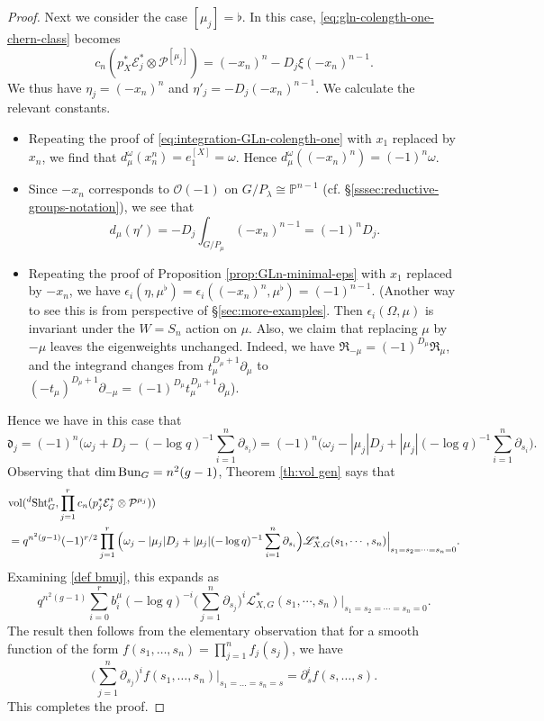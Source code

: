 \documentclass[reqno]{amsart}
\numberwithin{equation}{subsection}
\theoremstyle{definition}
\def\PP{\mathbb{P}}
\newcommand\cE{\mathcal{E}}
\newcommand\cO{\mathcal{O}}
\newcommand\cP{\mathcal{P}}
\newcommand\frR{\mathfrak{R}}
\newcommand\frd{\mathfrak{d}}
\newcommand{\sL}{{\mathscr{L}}}
\newcommand{\Bun}{\textup{Bun}}
\newcommand\Sht{\textup{Sht}}
\newcommand{\vol}{\textup{vol}}
\newcommand\ot{\otimes}
\newcommand\pl{\partial}
\begin{document}
\begin{proof}
 Next we consider the case $[\mu_j] = \flat$. In this case, \eqref{eq:gln-colength-one-chern-class} becomes
 \[
 c_n(p_X^* \cE_j^* \otimes \cP^{[\mu_j]}) = (-x_n)^n - D_j \xi (-x_n)^{n-1}. 
 \]
We thus have $\eta_j = (-x_n)^n$ and $\eta'_j = - D_j (-x_n)^{n-1}$. We calculate the relevant constants. 
\begin{itemize}

\item Repeating the proof of \eqref{eq:integration-GLn-colength-one} with $x_1$ replaced by $x_n$, we find that $d_{\mu}^\omega (x_n^n) = e_1^{[X]} =  \omega$. Hence $d_\mu^\omega((-x_n)^n) = (-1)^n \omega $. 

 
\item Since $-x_n$ corresponds to $\cO(-1)$ on $G/P_\lambda \cong \PP^{n-1}$ (cf. \S \ref{sssec:reductive-groups-notation}), we see that 
\[
d_{\mu}(\eta') =  -D_j \int_{G/P_\mu} (-x_n)^{n-1} = (-1)^n D_j  .
\]

\item Repeating the proof of Proposition \ref{prop:GLn-minimal-eps} with $x_1$ replaced by $-x_n$, we have $\epsilon_i(\eta, \mu^\flat) = \epsilon_i((-x_n)^n, \mu^\flat) = (-1)^{n-1}$. (Another way to see this is from perspective of \S \ref{sec:more-examples}. Then $\epsilon_i(\Omega, \mu)$ is invariant under the $W = S_n$ action on $\mu$. Also, we claim that replacing $\mu$ by $-\mu$ leaves the eigenweights unchanged. Indeed, we have $\frR_{-\mu} = (-1)^{D_\mu} \frR_\mu$, and the integrand changes from $t_\mu^{D_\mu + 1} \partial_\mu$ to $(-t_\mu)^{D_\mu+1} \partial_{-\mu} = (-1)^{D_\mu} t_\mu^{D_\mu+1}\partial_{\mu}$). 

\end{itemize}
Hence we have in this case that 
\begin{equation*}
\frd_{j} =  (-1)^n \Big(\omega_j +  D_j -  (- \log q)^{-1}\sum_{i=1}^{n} \pl_{s_{i}}  \Big) = (-1)^n \Big(\omega_j - |\mu_j|  D_j + |\mu_j|  (- \log q)^{-1}\sum_{i=1}^{n} \pl_{s_{i}}  \Big). 
\end{equation*} 
Observing that $\dim \Bun_G = n^2(g-1)$, Theorem \ref{th:vol gen} says that 
\begin{align*}
& \vol({}^{d}\Sht^{\mu}_{G}, \prod_{j=1}^{r}c_{n}(p_{j}^{*}\cE^{*}_{j}\ot\cP^{\mu_{j}}) )    \\
& = q^{n^2(g-1)} (-1)^{r/2}  \prod_{j=1}^r  \Big( \omega_j  - |\mu_j|  D_j + |\mu_j| (-\log q)^{-1}\sum_{i=1}^{n} \pl_{s_{i}} \Big) \sL^{*}_{X,G}(s_{1},\cdots, s_{n})\Big|_{s_{1}=s_{2}=\cdots=s_{n}=0}.
\end{align*}
Examining \eqref{def bmuj}, this expands as 
\[
q^{n^2(g-1)}  \sum_{i=0}^r  b_i^\mu (-\log q)^{-i} \Big(\sum_{j=1}^{n} \pl_{s_{j}} \Big)^i  \sL^{*}_{X,G}(s_{1},\cdots, s_{n})\Big|_{s_{1}=s_{2}=\cdots=s_{n}=0}. 
\] 
The result then follows from the elementary observation that for a smooth function of the form $f(s_1, \ldots, s_n) = \prod_{j=1}^n f_j(s_j)$, we have 
\begin{equation}\label{eq:partial-derivative-identity}
\Big(\sum_{j=1}^{n} \pl_{s_{j}}\Big)^i f(s_1, \ldots, s_n)|_{s_1 = \ldots = s_n=s} = \pl_s^i f(s, \ldots, s). 
\end{equation}
This completes the proof.
\end{proof}
\end{document}
